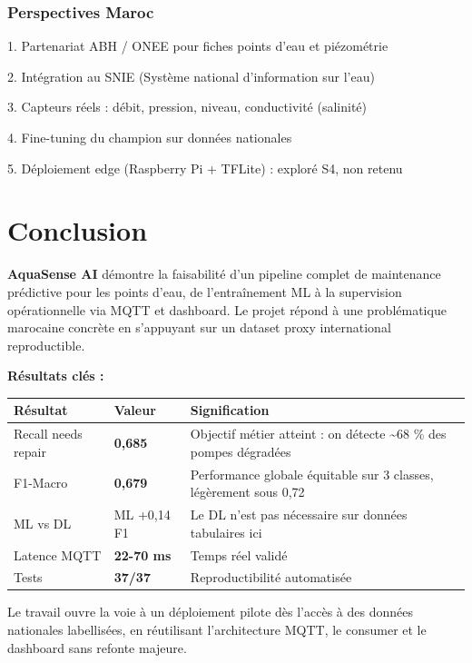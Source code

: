 \documentclass[11pt,a4paper]{report}
\begin{document}
\subsection{Perspectives Maroc}

1. Partenariat ABH / ONEE pour fiches points d'eau et piézométrie

2. Intégration au SNIE (Système national d'information sur l'eau)

3. Capteurs réels : débit, pression, niveau, conductivité (salinité)

4. Fine-tuning du champion sur données nationales

5. Déploiement edge (Raspberry Pi + TFLite) : exploré S4, non retenu

\chapter{Conclusion}

\textbf{AquaSense AI} démontre la faisabilité d'un pipeline complet de maintenance prédictive pour les points d'eau, de l'entraînement ML à la supervision opérationnelle via MQTT et dashboard. Le projet répond à une problématique marocaine concrète en s'appuyant sur un dataset proxy international reproductible.

\textbf{Résultats clés :}

{\small
\begin{longtable}{@{}>{\raggedright\arraybackslash}p{}>{\raggedright\arraybackslash}p{}>{\raggedright\arraybackslash}p{}@{}}
\toprule
\rowcolor{EHTPTableHead}Résultat & Valeur & Signification \\
\midrule
Recall needs repair & \textbf{0,685} & Objectif métier atteint : on détecte \textasciitilde{}68 \% des pompes dégradées \\
F1-Macro & \textbf{0,679} & Performance globale équitable sur 3 classes, légèrement sous 0,72 \\
ML vs DL & ML +0,14 F1 & Le DL n'est pas nécessaire sur données tabulaires ici \\
Latence MQTT & \textbf{22-70 ms} & Temps réel validé \\
Tests & \textbf{37/37} & Reproductibilité automatisée \\
\bottomrule
\end{longtable}
}

Le travail ouvre la voie à un déploiement pilote dès l'accès à des données nationales labellisées, en réutilisant l'architecture MQTT, le consumer et le dashboard sans refonte majeure.
\end{document}
